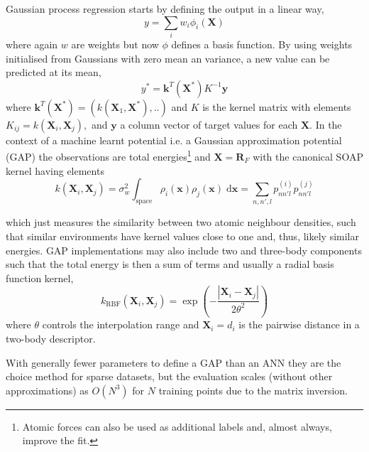 \documentclass[main.tex]{subfiles}
\begin{document}
Gaussian process regression starts by defining the output in a linear way,
\begin{equation}
	y = \sum_i w_i \phi_i(\boldsymbol{X})
\end{equation}
where again $w$ are weights but now $\phi$ defines a basis function. By using weights initialised from Gaussians with zero mean an variance, a new value can be predicted at its mean,\cite{Bartok2015, Williams1996gaussian}
\begin{equation}
	y^* = \boldsymbol{k}^T(\boldsymbol{X}^*) K^{-1} \boldsymbol{y}
\end{equation}
where $ \boldsymbol{k}^T(\boldsymbol{X}^*) = (k(\boldsymbol{X}_1, \boldsymbol{X}^*), ..)$ and $K$ is the kernel matrix with elements $K_{ij} = k(\boldsymbol{X}_i, \boldsymbol{X}_j),$ and $\boldsymbol{y}$ a column vector of target values for each $\boldsymbol{X}$. In the context of a machine learnt potential i.e. a Gaussian approximation potential (GAP) the observations are total energies\footnote{Atomic forces can also be used as additional labels and, almost always, improve the fit.} and $\boldsymbol{X} = \boldsymbol{R}_F$ with the canonical SOAP kernel having elements
\begin{equation}
	k(\boldsymbol{X}_i, \boldsymbol{X}_j) = \sigma_w^2 \int_\text{space} \rho_i (\boldsymbol{x}) \rho_j (\boldsymbol{x})\; \text{d}\boldsymbol{x} = \sum_{n, n', l} p_{nn'l}^{(i)}p_{nn'l}^{(j)} 
\end{equation}

which just measures the similarity between two atomic neighbour densities, such that similar environments have kernel values close to one and, thus, likely similar energies. GAP implementations may also include two and three-body components such that the total energy is then a sum of terms and usually a radial basis function kernel,
\begin{equation}
	k_\text{RBF}(\boldsymbol{X}_i, \boldsymbol{X}_j) = \exp\left(-\frac{|\boldsymbol{X}_i - \boldsymbol{X}_j|}{2\theta^2}\right)
\end{equation}
where $\theta$ controls the interpolation range and $\boldsymbol{X}_i = d_i$ is the pairwise distance in a two-body descriptor.

With generally fewer parameters to define a GAP than an ANN they are the choice method for sparse datasets, but the evaluation scales (without other approximations) as $O(N^3)$ for $N$ training points due to the matrix inversion.





\clearpage
\end{document}
